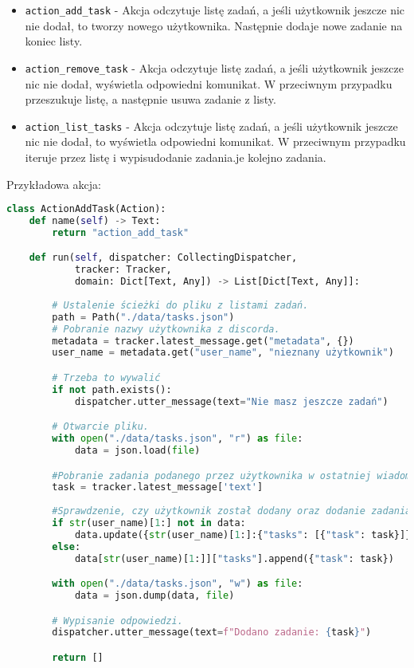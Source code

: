 \documentclass{article}
\begin{document}
\begin{itemize}
    \item \verb|action_add_task| - Akcja odczytuje listę zadań, a jeśli
        użytkownik jeszcze nic nie dodał, to tworzy nowego użytkownika.
        Następnie dodaje nowe zadanie na koniec listy.
    \item \verb|action_remove_task| - Akcja odczytuje listę zadań, a jeśli
        użytkownik jeszcze nic nie dodał, wyświetla odpowiedni komunikat.
        W przeciwnym przypadku przeszukuje listę, a następnie usuwa zadanie
        z listy.
    \item \verb|action_list_tasks| - Akcja odczytuje listę zadań, a jeśli
        użytkownik jeszcze nic nie dodał, to wyświetla odpowiedni komunikat.
        W przeciwnym przypadku iteruje przez listę i wypisudodanie zadania.je kolejno zadania.
\end{itemize}
Przykładowa akcja:
\begin{lstlisting}[language=Python, caption=Akcja dodawania]
class ActionAddTask(Action):
    def name(self) -> Text:
        return "action_add_task"

    def run(self, dispatcher: CollectingDispatcher,
            tracker: Tracker,
            domain: Dict[Text, Any]) -> List[Dict[Text, Any]]:
        
        # Ustalenie ścieżki do pliku z listami zadań.
        path = Path("./data/tasks.json")
        # Pobranie nazwy użytkownika z discorda.
        metadata = tracker.latest_message.get("metadata", {})
        user_name = metadata.get("user_name", "nieznany użytkownik")

        # Trzeba to wywalić
        if not path.exists():
            dispatcher.utter_message(text="Nie masz jeszcze zadań")

        # Otwarcie pliku.
        with open("./data/tasks.json", "r") as file:
            data = json.load(file)

        #Pobranie zadania podanego przez użytkownika w ostatniej wiadomości.
        task = tracker.latest_message['text']
        
        #Sprawdzenie, czy użytkownik został dodany oraz dodanie zadania.
        if str(user_name)[1:] not in data:
            data.update({str(user_name)[1:]:{"tasks": [{"task": task}]}})
        else:
            data[str(user_name)[1:]]["tasks"].append({"task": task})

        with open("./data/tasks.json", "w") as file:
            data = json.dump(data, file)

        # Wypisanie odpowiedzi.
        dispatcher.utter_message(text=f"Dodano zadanie: {task}")

        return []
\end{lstlisting}
\end{document}
